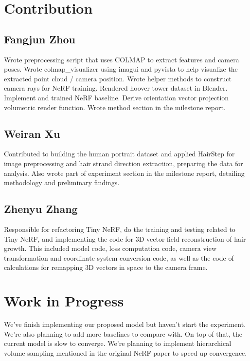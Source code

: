 \documentclass[12pt]{article}
\begin{document}
\section{Contribution}

\subsection{Fangjun Zhou}

Wrote preprocessing script that uses COLMAP to extract features and camera poses. Wrote colmap\_visualizer using imagui and pyvista to help visualize the extracted point cloud / camera position. Wrote helper methods to construct camera rays for NeRF training. Rendered hoover tower dataset in Blender. Implement and trained NeRF baseline. Derive orientation vector projection volumetric render function. Wrote method section in the milestone report.

\subsection{Weiran Xu}

Contributed to building the human portrait dataset and applied HairStep for image preprocessing and hair strand direction extraction, preparing the data for analysis. Also wrote part of experiment section in the milestone report, detailing methodology and preliminary findings.

\subsection{Zhenyu Zhang}

Responsible for refactoring Tiny NeRF, do the training and testing related to Tiny NeRF, and implementing the code for 3D vector field reconstruction of hair growth. This included model code, loss computation code, camera view transformation and coordinate system conversion code, as well as the code of calculations for remapping 3D vectors in space to the camera frame.

\section{Work in Progress}

We've finish implementing our proposed model but haven't start the experiment. We're also planning to add more baselines to compare with. On top of that, the current model is slow to converge. We're planning to implement hierarchical volume sampling mentioned in the original NeRF paper to speed up convergence.

\printbibliography
\end{document}
